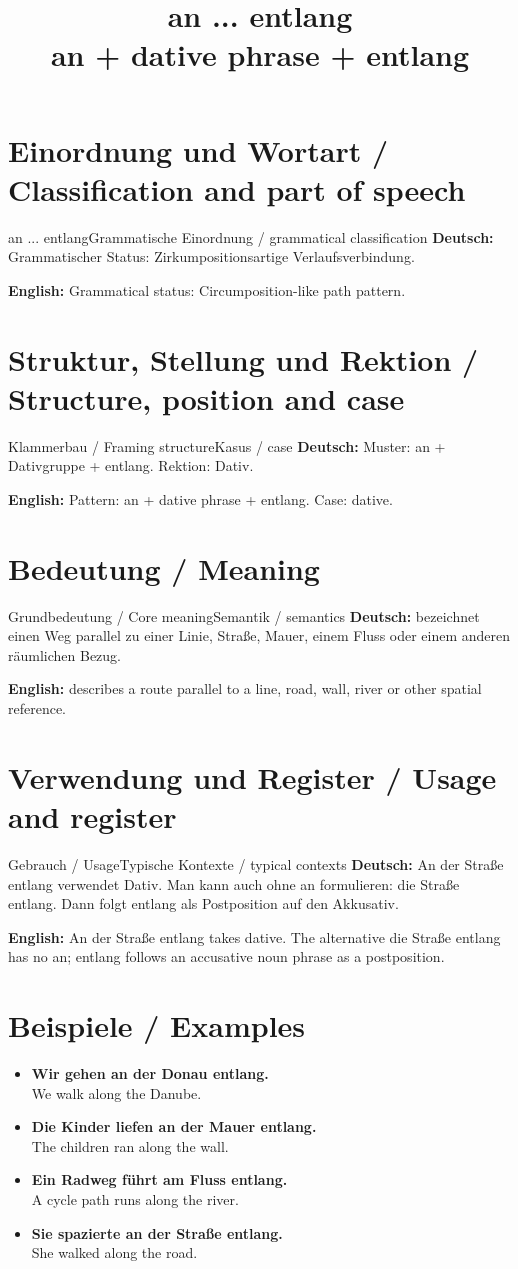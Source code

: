 \documentclass[a4paper,11pt]{article}
\title{an ... entlang\\ \large an + dative phrase + entlang}
\date{}
\newcommand{\GermanText}[1]{\textbf{Deutsch: }#1\par}
\newcommand{\EnglishText}[1]{{\small\color{SoftGray}\textbf{English: }#1\par}}
\newcommand{\ExampleItem}[2]{\item \textbf{#1}\\{\small\color{SoftGray}#2}}
\begin{document}
\maketitle
\tableofcontents
\newpage
\section{Einordnung und Wortart / Classification and part of speech}
\begin{grammarentry}{an ... entlang}{Grammatische Einordnung / grammatical classification}
\GermanText{Grammatischer Status: Zirkumpositionsartige Verlaufsverbindung.}
\EnglishText{Grammatical status: Circumposition-like path pattern.}
\end{grammarentry}
\section{Struktur, Stellung und Rektion / Structure, position and case}
\begin{grammarentry}{Klammerbau / Framing structure}{Kasus / case}
\GermanText{Muster: an + Dativgruppe + entlang. Rektion: Dativ.}
\EnglishText{Pattern: an + dative phrase + entlang. Case: dative.}
\end{grammarentry}
\section{Bedeutung / Meaning}
\begin{grammarentry}{Grundbedeutung / Core meaning}{Semantik / semantics}
\GermanText{bezeichnet einen Weg parallel zu einer Linie, Straße, Mauer, einem Fluss oder einem anderen räumlichen Bezug.}
\EnglishText{describes a route parallel to a line, road, wall, river or other spatial reference.}
\end{grammarentry}
\section{Verwendung und Register / Usage and register}
\begin{grammarentry}{Gebrauch / Usage}{Typische Kontexte / typical contexts}
\GermanText{An der Straße entlang verwendet Dativ. Man kann auch ohne an formulieren: die Straße entlang. Dann folgt entlang als Postposition auf den Akkusativ.}
\EnglishText{An der Straße entlang takes dative. The alternative die Straße entlang has no an; entlang follows an accusative noun phrase as a postposition.}
\end{grammarentry}
\section{Beispiele / Examples}
\begin{exbox}
\begin{itemize}
\ExampleItem{Wir gehen an der Donau entlang.}{We walk along the Danube.}
\ExampleItem{Die Kinder liefen an der Mauer entlang.}{The children ran along the wall.}
\ExampleItem{Ein Radweg führt am Fluss entlang.}{A cycle path runs along the river.}
\ExampleItem{Sie spazierte an der Straße entlang.}{She walked along the road.}
\end{itemize}
\end{exbox}
\end{document}
